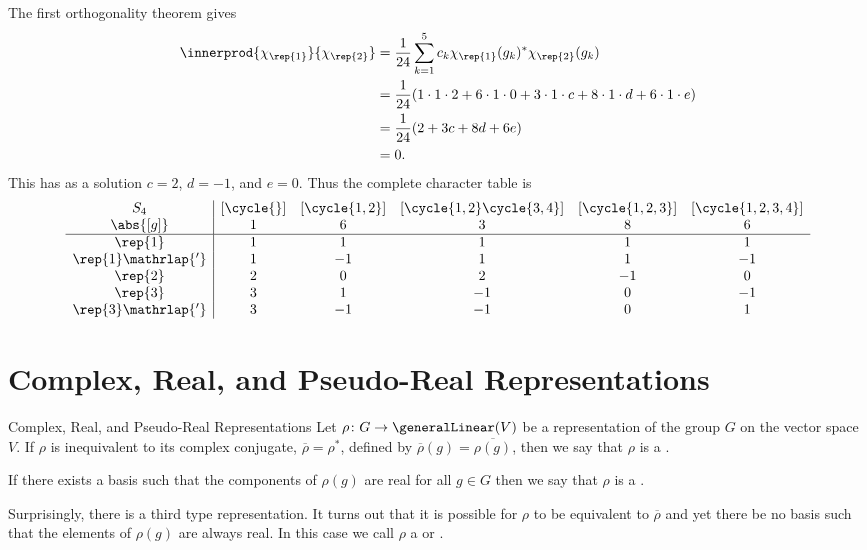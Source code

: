 The first orthogonality theorem gives
\begin{align}
    \innerprod{\chi_{\rep{1}}}{\chi_{\rep{2}}} &= \frac{1}{24} \sum_{k =
        1}^{5} c_k \chi_{\rep{1}}(g_k)^*\chi_{\rep{2}}(g_k)\\
    &= \frac{1}{24} (1\cdot 1 \cdot 2 + 6 \cdot 1 \cdot 0 + 3 \cdot 1 \cdot
    c + 8 \cdot 1 \cdot d + 6 \cdot 1 \cdot e)\\
    &= \frac{1}{24}(2 + 3c + 8d + 6e)\\
    &= 0.
\end{align}
This has as a solution \(c = 2\), \(d = -1\), and \(e = 0\).
Thus the complete character table is
\begin{equation}
    \begin{array}{c|ccccc}
        S_4 & [\cycle{}] & [\cycle{1,2}] & [\cycle{1,2}\cycle{3,4}] &
        [\cycle{1,2,3}] & [\cycle{1,2,3,4}]\\
        \abs{[g]} & 1 & 6 & 3 & 8 & 6 \\ \hline
        \rep{1} & 1 & 1 & 1 & 1 & 1 \\
        \rep{1}\mathrlap{'} & 1 & -1 & 1 & 1 & -1\\
        \rep{2} & 2 & 0 &  2 & -1 & 0 \\
        \rep{3} & 3 & 1 & -1 & 0 & -1\\
        \rep{3}\mathrlap{'} & 3 & -1 & -1 & 0 & 1
    \end{array}
\end{equation} 

\section{Complex, Real, and Pseudo-Real Representations}
\begin{dfn}{Complex, Real, and Pseudo-Real Representations}{}
    Let \(\rho \colon G \to \generalLinear(V)\) be a representation of the
    group \(G\) on the vector space \(V\).
    If \(\rho\) is inequivalent to its complex conjugate, \(\overline{\rho}
    = \rho^*\), defined by \(\overline{\rho}(g) = \overline{\rho(g)}\), then we say
    that \(\rho\) is a .
    
    If there exists a basis such that the components of \(\rho(g)\) are real
    for all \(g \in G\) then we say that \(\rho\) is a .
    
    Surprisingly, there is a third type representation.
    It turns out that it is possible for \(\rho\) to be equivalent to
    \(\overline{\rho}\) and yet there be no basis such that the elements of
    \(\rho(g)\) are always real.
    In this case we call \(\rho\) a 
    or .
\end{dfn}

